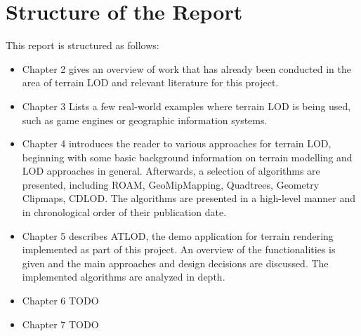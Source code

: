 \section{Structure of the Report}
This report is structured as follows:
\begin{itemize}
  \item Chapter 2 gives an overview of work that has already been conducted in the area of terrain LOD
        and relevant literature for this project.
  \item Chapter 3 Lists a few real-world examples where terrain LOD is being used, such as 
        game engines or geographic information systems.
  \item Chapter 4 introduces the reader to various approaches for terrain LOD, beginning with some basic background
        information on terrain modelling and LOD approaches in general. Afterwards, a selection of algorithms
        are presented, including ROAM, GeoMipMapping, Quadtrees, Geometry Clipmaps, CDLOD. 
        The algorithms are presented in a high-level manner and in chronological order of their publication date.
  \item Chapter 5 describes ATLOD, the demo application for terrain rendering implemented as part of this project.
        An overview of the functionalities is given and the main approaches and design decisions are discussed.
        The implemented algorithms are analyzed in depth. 
  \item Chapter 6 TODO
  \item Chapter 7 TODO 
\end{itemize}



